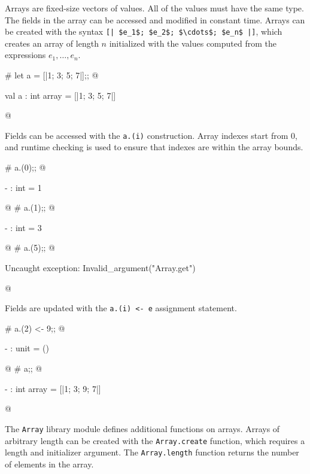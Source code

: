 \label{keyword:arrays}
Arrays are fixed-size vectors of values.  All of the values must have
the same type.  The fields in the array can be accessed and modified
in constant time.  Arrays can be created with the syntax
%
\hbox{\lstinline/[| $e_1$; $e_2$; $\cdots$; $e_n$ |]/},
which creates an array of length $n$ initialized with
the values computed from the expressions $e_1, \ldots, e_n$.

\begin{ocaml}
# let a = [|1; 3; 5; 7|];;
@
\begin{topoutput}
val a : int array = [|1; 3; 5; 7|]
\end{topoutput}
@
\end{ocaml}
%
\label{patterns:arrays}
\label{keyword:.(}
Fields can be accessed with the \hbox{\lstinline/a.(i)/} construction.  Array
indexes start from 0, and runtime checking is used to ensure that indexes are
within the array bounds.

\begin{ocaml}
# a.(0);;
@
\begin{topoutput}
- : int = 1
\end{topoutput}
@
# a.(1);;
@
\begin{topoutput}
- : int = 3
\end{topoutput}
@
# a.(5);;
@
\begin{topoutput}
Uncaught exception: Invalid_argument("Array.get")
\end{topoutput}
@
\end{ocaml}
%
\label{keyword:<-(array-field-assignment)}
Fields are updated with the \hbox{\lstinline/a.(i) <- e/} assignment
statement.

\begin{ocaml}
# a.(2) <- 9;;
@
\begin{topoutput}
- : unit = ()
\end{topoutput}
@
# a;;
@
\begin{topoutput}
- : int array = [|1; 3; 9; 7|]
\end{topoutput}
@
\end{ocaml}
%
The \hbox{\lstinline/Array/} library module defines additional functions on arrays.
Arrays of arbitrary length can be created with the \hbox{\lstinline/Array.create/}
function, which requires a length and initializer argument.  The
\hbox{\lstinline/Array.length/} function returns the number of elements in the
array.

